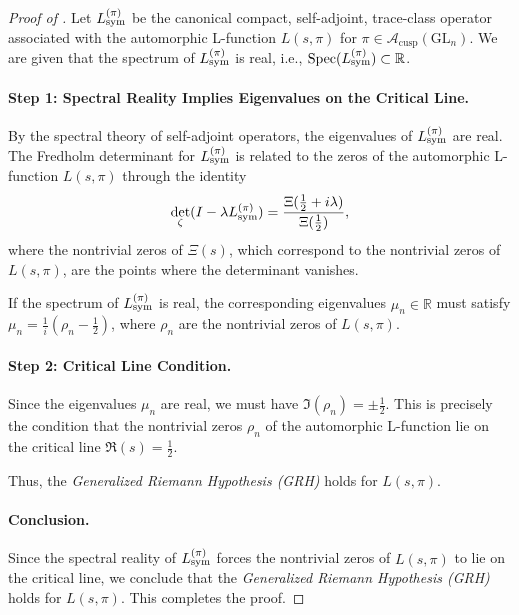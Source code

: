 \begin{proof}[Proof of ]
Let \( L_{\mathrm{sym}}^{(\pi)} \) be the canonical compact, self-adjoint, trace-class operator associated with the automorphic L-function \( L(s, \pi) \) for \( \pi \in \mathcal{A}_{\text{cusp}}(\mathrm{GL}_n) \). We are given that the spectrum of \( L_{\mathrm{sym}}^{(\pi)} \) is real, i.e., \( \operatorname{Spec}(L_{\mathrm{sym}}^{(\pi)}) \subset \mathbb{R} \).

\paragraph{Step 1: Spectral Reality Implies Eigenvalues on the Critical Line.}
By the spectral theory of self-adjoint operators, the eigenvalues of \( L_{\mathrm{sym}}^{(\pi)} \) are real. The Fredholm determinant for \( L_{\mathrm{sym}}^{(\pi)} \) is related to the zeros of the automorphic L-function \( L(s, \pi) \) through the identity
\[
\det_\zeta(I - \lambda L_{\mathrm{sym}}^{(\pi)}) = \frac{\Xi(\frac{1}{2} + i\lambda)}{\Xi(\frac{1}{2})},
\]
where the nontrivial zeros of \( \Xi(s) \), which correspond to the nontrivial zeros of \( L(s, \pi) \), are the points where the determinant vanishes.

If the spectrum of \( L_{\mathrm{sym}}^{(\pi)} \) is real, the corresponding eigenvalues \( \mu_n \in \mathbb{R} \) must satisfy \( \mu_n = \frac{1}{i}(\rho_n - \frac{1}{2}) \), where \( \rho_n \) are the nontrivial zeros of \( L(s, \pi) \).

\paragraph{Step 2: Critical Line Condition.}
Since the eigenvalues \( \mu_n \) are real, we must have \( \Im(\rho_n) = \pm \frac{1}{2} \). This is precisely the condition that the nontrivial zeros \( \rho_n \) of the automorphic L-function lie on the critical line \( \Re(s) = \frac{1}{2} \).

Thus, the \emph{Generalized Riemann Hypothesis (GRH)} holds for \( L(s, \pi) \).

\paragraph{Conclusion.}
Since the spectral reality of \( L_{\mathrm{sym}}^{(\pi)} \) forces the nontrivial zeros of \( L(s, \pi) \) to lie on the critical line, we conclude that the \emph{Generalized Riemann Hypothesis (GRH)} holds for \( L(s, \pi) \). This completes the proof.
\end{proof}
